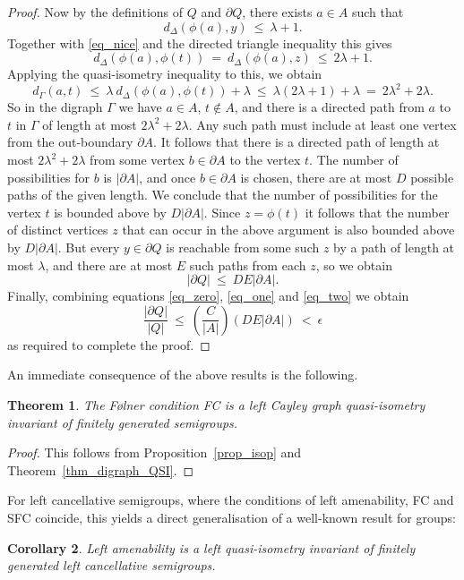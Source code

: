 \documentclass[11pt,a4paper,reqno]{amsart}
\newtheorem{theorem}{Theorem}[section]
\newtheorem{corollary}[theorem]{Corollary}
\begin{document}
\begin{proof}
Now by the definitions of $Q$ and $\partial Q$, there exists $a \in A$
such that
\[
d_{\Delta}(\phi(a), y) \ \leq \ \lambda + 1. 
\]
Together with \eqref{eq_nice} and the directed triangle inequality this gives
\[
d_{\Delta}(\phi(a), \phi(t)) \ = \ d_{\Delta}(\phi(a), z) \ \leq \ 2\lambda + 1. 
\]
Applying the quasi-isometry inequality to this, we obtain
\[
d_{\Gamma}(a,t) \ \leq \ \lambda \ d_{\Delta}(\phi(a), \phi(t)) + \lambda \ \leq \ \lambda(2\lambda + 1) + \lambda \ = \ 2\lambda^2 + 2\lambda. 
\]
So in the digraph $\Gamma$ we have $a \in A$, $t \not\in A$, and there is a
directed path from $a$ to $t$ in $\Gamma$ of length at most 
$2\lambda^2 + 2\lambda$. Any such path must include at least one vertex
from the out-boundary $\partial A$. It follows that there is a directed
path of length at most $2\lambda^2 + 2\lambda$ from some vertex
$b \in \partial A$ to the vertex $t$. The number of possibilities for
$b$ is $|\partial A|$, and once $b \in \partial A$ is chosen, there are
at most $D$ possible paths of the given length. We conclude that the
number of possibilities for the vertex $t$ is bounded above by
$D |\partial A|$. Since $z = \phi(t)$ it follows that the number of
distinct vertices $z$ that can occur in the above argument is also
bounded above by $D |\partial A|$. But every $y \in \partial Q$ is
reachable from some such $z$ by a path of length at most $\lambda$, and
there are at most $E$ such paths from each $z$, so we obtain
\begin{equation}\label{eq_two}
|\partial Q| \ \leq \ DE |\partial A|. 
\end{equation}
Finally, combining equations \eqref{eq_zero}, \eqref{eq_one} and \eqref{eq_two} 
we obtain
\[
\frac{|\partial Q|}{|Q|} \ \leq \ \left( \frac{C}{|A|} \right) \left( D E |\partial A| \right) \ < \ \epsilon
\]
as required to complete the proof. 
\end{proof}

An immediate consequence of the above results is the following. 

\begin{theorem}\label{thm_qsi}
The F\o lner condition FC is a left Cayley graph quasi-isometry invariant of finitely generated semigroups. 
\end{theorem}
\begin{proof}
This follows from Proposition~\ref{prop_isop} and Theorem~\ref{thm_digraph_QSI}. 
\end{proof}

For left cancellative semigroups, where the conditions of left amenability,
FC and SFC coincide, this yields a direct generalisation of a well-known
result for groups:
\begin{corollary}\label{cor_AM_QSI}
Left amenability is a left quasi-isometry invariant of finitely generated
left cancellative semigroups. 
\end{corollary}
\end{document}
